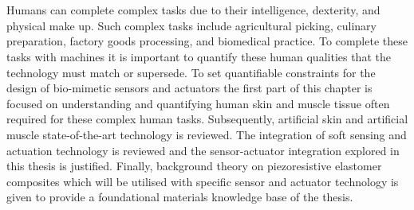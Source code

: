 \chapter{\chapiiname}
\label{chapter2}
Humans can complete complex tasks due to their intelligence, dexterity, and physical make up. Such complex tasks include agricultural picking, culinary preparation, factory goods processing, and biomedical practice. To complete these tasks with machines it is important to quantify these human qualities that the technology must match or supersede. To set quantifiable constraints for the design of bio-mimetic sensors and actuators the first part of this chapter is focused on understanding and quantifying human skin and muscle tissue often required for these complex human tasks. Subsequently, artificial skin and artificial muscle state-of-the-art technology is reviewed. The integration of soft sensing and actuation technology is reviewed and the sensor-actuator integration explored in this thesis is justified. Finally, background theory on piezoresistive elastomer composites which will be utilised with specific sensor and actuator technology is given to provide a foundational materials knowledge base of the thesis.



